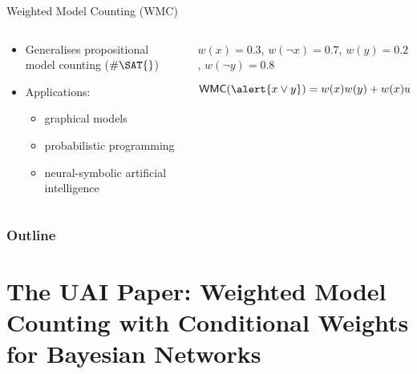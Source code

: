 \documentclass{beamer}
\begin{document}
\begin{frame}[fragile]{Weighted Model Counting (WMC)}
  \begin{columns}
    \begin{column}{0.5\textwidth}
      \begin{itemize}
      \item Generalises propositional model counting ($\#\SAT{}$)
      \item Applications:
        \begin{itemize}
        \item graphical models
        \item probabilistic programming
        \item neural-symbolic artificial intelligence
        \end{itemize}
      \end{itemize}
    \end{column}
    \begin{column}{0.5\textwidth}
      \begin{example}
      $w(x) = 0.3$, $w(\neg x) = 0.7$, $w(y) = 0.2$, $w(\neg y) = 0.8$
      \vspace{1cm}

      $\mathsf{WMC}(\alert{x \lor y}) = w(x)w(y) + w(x)w(\neg y) + w(\neg x)w(y)
      = 0.44$
      \end{example}
    \end{column}
  \end{columns}
\end{frame}

\begin{frame}
  \frametitle{Outline}
  \tableofcontents
\end{frame}

\section{The UAI Paper: Weighted Model Counting with Conditional Weights for Bayesian Networks}
\end{document}
